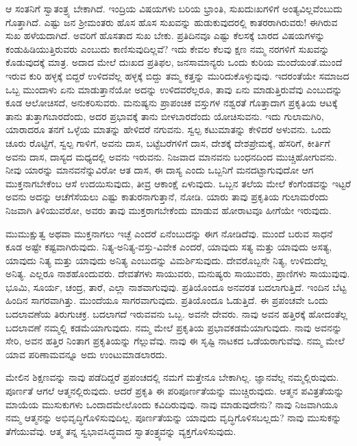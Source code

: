 ಆ ಸಂತನಿಗೆ ಸ್ವಾತಂತ್ರ್ಯ ಬೇಕಾಗಿದೆ. ಇಂದ್ರಿಯ ವಿಷಯಗಳು ಬರಿಯ ಭ್ರಾಂತಿ, ಸುಖದುಃಖಗಳಿಗೆ ಅಂತ್ಯವಿಲ್ಲವೆಂಬುದು ಗೊತ್ತಾಗಿದೆ. ಎಷ್ಟು ಜನ ಶ‍್ರೀಮಂತರು ಹೊಸ ಹೊಸ ಸುಖವನ್ನು ಹುಡುಕುವುದರಲ್ಲಿ ಕಾತರರಾಗಿರುವರು! ಈಗಿರುವ ಸುಖ ಹಳೆಯದಾಗಿದೆ. ಅವರಿಗೆ ಹೊಸತಾದ ಸುಖ ಬೇಕು. ಪ್ರತಿದಿನವೂ ಎಷ್ಟು ಕೆಲಸಕ್ಕೆ ಬಾರದ ವಿಷಯಗಳನ್ನು ಕಂಡುಹಿಡಿಯುತ್ತಿರುವರು ಎಂಬುದು ಕಾಣಿಸುವುದಿಲ್ಲವೆ? ಇದು ಕೇವಲ ಕೆಲವು ಕ್ಷಣ ನಮ್ಮ ನರಗಳಿಗೆ ಸುಖವನ್ನು ಕೊಡುವುದಕ್ಕೆ ಮಾತ್ರ. ಅದಾದ ಮೇಲೆ ದುಃಖದ ಪ್ರತಿಫಲ, ಜನಸಾಮಾನ್ಯರು ಒಂದು ಕುರಿಯ ಮಂದೆಯಂತೆ.\break ಮುಂದೆ ಇರುವ ಕುರಿ ಹಳ್ಳಕ್ಕೆ ಬಿದ್ದರೆ ಉಳಿದವೆಲ್ಲ ಹಳ್ಳಕ್ಕೆ ಬಿದ್ದು ತಮ್ಮ ಕತ್ತನ್ನು ಮುರಿದುಕೊಳ್ಳುವುವು. ಇದರಂತೆಯೇ ಸಮಾಜದ ಒಬ್ಬ ಮುಂದಾಳು ಏನು ಮಾಡುತ್ತಾನೆಯೋ ಅದನ್ನು ಉಳಿದವರೆಲ್ಲರೂ, ತಾವು ಏನು ಮಾಡುತ್ತಿರುವೆವು ಎಂಬುದನ್ನು ಕೂಡ ಆಲೋಚಿಸದೆ, ಅನುಕರಿಸುವರು. ಮನುಷ್ಯನು ಪ್ರಾಪಂಚಿಕ ವಸ್ತುಗಳ ನಶ್ವರತೆ ಗೊತ್ತಾದಾಗ ಪ್ರಕೃತಿಯ ಆಟಕ್ಕೆ ತಾನು ತುತ್ತಾಗಬಾರದೆಂದು, ಅದರ ಪ್ರಭಾವಕ್ಕೆ ತಾನು ಬೀಳಬಾರದೆಂದು ಯೋಚಿಸುವನು. ಇದು ಗುಲಾಮಗಿರಿ, ಯಾರಾದರೂ ತನಗೆ ಒಳ್ಳೆಯ ಮಾತನ್ನು ಹೇಳಿದರೆ ನಗುವನು. ಸ್ವಲ್ಪ ಕಟುಮಾತನ್ನು ಕೇಳಿದರೆ ಅಳುವನು. ಒಂದು ಚೂರು ರೊಟ್ಟಿಗೆ, ಸ್ವಲ್ಪ ಗಾಳಿಗೆ, ಅವನು ದಾಸ, ಬಟ್ಟೆಬರೆಗಳಿಗೆ ದಾಸ, ದೇಶಕ್ಕೆ ದೇಶಪ್ರೇಮಕ್ಕೆ, ಹೆಸರಿಗೆ, ಕೀರ್ತಿಗೆ ಅವನು ದಾಸ, ದಾಸ್ಯದ ಮಧ್ಯದಲ್ಲಿ ಅವನು ಇರುವನು. ನಿಜವಾದ ಮಾನವನು ಬಂಧನದಿಂದ ಮುಚ್ಚಿಹೋಗುವನು. ನೀವು ಯಾರನ್ನು ಮಾನವನೆನ್ನುವಿರೋ ಆತ ದಾಸ, ಈ ದಾಸ್ಯ ಎಂದು ಒಬ್ಬನಿಗೆ ಮನದಟ್ಟಾಗುವುದೋ ಆಗ ಮುಕ್ತನಾಗಬೇಕೆಂಬ ಆಸೆ ಉದಯಿಸುವುದು, ತೀವ್ರ ಆಕಾಂಕ್ಷೆ ಏಳುವುದು. ಒಬ್ಬನ ತಲೆಯ ಮೇಲೆ ಕೆಂಗೆಂಡವನ್ನು ಇಟ್ಟರೆ ಅವನು ಅದನ್ನು ಆಚೆಗೆಸೆಯಲು ಎಷ್ಟು ಕಾತುರನಾಗುತ್ತಾನೆ, ನೋಡಿ. ಯಾರು ತಾವು ಪ್ರಕೃತಿಯ ಗುಲಾಮರೆಂದು ನಿಜವಾಗಿ ತಿಳಿಯುವರೋ, ಅವರು ತಾವು ಮುಕ್ತರಾಗಬೇಕೆಂದು ಮಾಡುವ ಹೋರಾಟವೂ ಹೀಗೆಯೇ ಇರುವುದು.

ಮುಮುಕ್ಷುತ್ವ ಅಥವಾ ಮುಕ್ತನಾಗಲು ಇಚ್ಛೆ ಎಂದರೆ ಏನೆಂಬುದನ್ನು ಈಗ ನೋಡಿದೆವು. ಮುಂದೆ ಬರುವ ಸಾಧನೆ ಕೂಡ ಅಷ್ಟೇ ಕಷ್ಟವಾಗಿರುವುದು. ನಿತ್ಯ-ಅನಿತ್ಯ-\break ವಸ್ತು-ವಿವೇಕ ಎಂದರೆ, ಯಾವುದು ಸತ್ಯ ಮತ್ತು ಯಾವುದು ಅಸತ್ಯ, ಯಾವುದು ನಿತ್ಯ ಮತ್ತು ಯಾವುದು ಅನಿತ್ಯ ಎಂಬುದನ್ನು ವಿಮರ್ಶಿಸುವುದು. ದೇವರೊಬ್ಬನೇ ನಿತ್ಯ, ಉಳಿದುದೆಲ್ಲ ಅನಿತ್ಯ. ಎಲ್ಲರೂ ನಾಶಹೊಂದುವರು. ದೇವತೆಗಳು ಸಾಯುವರು, ಮನುಷ್ಯರು ಸಾಯುವರು, ಪ್ರಾಣಿಗಳು ಸಾಯುವುವು. ಭೂಮಿ, ಸೂರ್ಯ, ಚಂದ್ರ, ತಾರೆ, ಎಲ್ಲಾ ನಾಶವಾಗುವುವು. ಪ್ರತಿಯೊಂದೂ ಅನವರತ ಬದಲಾಗುತ್ತಿದೆ. ಇಂದಿನ ಬೆಟ್ಟ ಹಿಂದಿನ ಸಾಗರವಾಗಿತ್ತು. ಮುಂದೆಯೂ ಸಾಗರವಾಗುವುದು. ಪ್ರತಿಯೊಂದೂ ಓಡುತ್ತಿದೆ. ಈ ಪ್ರಪಂಚವೇ ಒಂದು ಬದಲಾವಣೆಯ ತಿರುಗುಚಕ್ರ. ಬದಲಾಗದೆ ಇರುವವನು ಒಬ್ಬ. ಅವನೇ ದೇವರು. ನಾವು ಅವನ ಹತ್ತಿರಕ್ಕೆ ಹೋದಂತೆಲ್ಲ ಬದಲಾವಣೆ ನಮ್ಮಲ್ಲಿ ಕಡಮೆಯಾಗುವುದು. ನಮ್ಮ ಮೇಲೆ ಪ್ರಕೃತಿಯ ಪ್ರಭಾವ\break ಕಡಮೆಯಾಗುವುದು. ನಾವು ಅವನನ್ನು ಸೇರಿ, ಅವನ ಹತ್ತಿರ ನಿಂತಾಗ ಪ್ರಕೃತಿಯನ್ನು ಗೆಲ್ಲುವೆವು. ನಾವು ಈ ಸೃಷ್ಟಿ ನಾಟಕದ ಒಡೆಯರಾಗುವೆವು. ನಮ್ಮ ಮೇಲೆ ಯಾವ ಪರಿಣಾಮವನ್ನೂ ಅದು ಉಂಟುಮಾಡಲಾರದು.

ಮೇಲಿನ ಶಿಕ್ಷಣವನ್ನು ನಾವು ಪಡೆದಿದ್ದರೆ ಪ್ರಪಂಚದಲ್ಲಿ ನಮಗೆ ಮತ್ತೇನೂ ಬೇಕಾಗಿಲ್ಲ. ಜ್ಞಾನವೆಲ್ಲ ನಮ್ಮಲ್ಲಿರುವುದು. ಪೂರ್ಣತೆ ಆಗಲೆ ಆತ್ಮನಲ್ಲಿರುವುದು. ಆದರೆ ಪ್ರಕೃತಿ ಈ ಪರಿಪೂರ್ಣತೆಯನ್ನು ಮುಚ್ಚಿರುವುದು. ಆತ್ಮನ ಪವಿತ್ರತೆಯನ್ನು ಮಾಯೆಯ ಮುಸುಕುಗಳು ಒಂದಾದಮೇಲೊಂದು ಕವಿದಿರುವುವು. ನಾವು ಮಾಡುವುದೇನು? ನಾವು ನಿಜವಾಗಿಯೂ ನಮ್ಮ ಆತ್ಮನನ್ನು ಅಭಿವೃದ್ಧಿಗೊಳಿಸುವುದಿಲ್ಲ. ಪೂರ್ಣತೆಯನ್ನು ಯಾವುದು ವೃದ್ಧಿಗೊಳಿಸಬಲ್ಲದು? ನಾವು ಮುಸುಕನ್ನು ತೆಗೆಯುವೆವು. ಆತ್ಮ ತನ್ನ ಸ್ವಭಾವಸಿದ್ಧವಾದ ಸ್ವಾತಂತ್ರ್ಯವನ್ನು ವ್ಯಕ್ತಗೊಳಿಸುವುದು.

